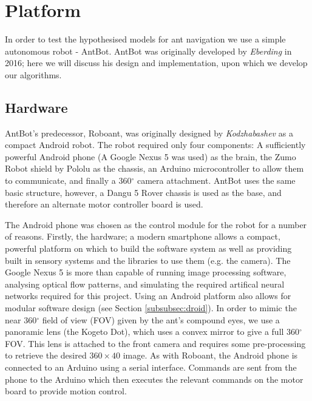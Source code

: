 \documentclass[a4paper,11pt,twoside,openright]{article}
\let\oldsection\section
\def\section{\cleardoublepage\oldsection}
\begin{document}
\section{ Platform } \label{sec:platform}
In order to test the hypothesised models for ant navigation we use a simple autonomous robot - AntBot.
AntBot was originally developed by \textit{Eberding} in 2016; here we will discuss his design and
implementation, upon which we develop our algorithms.

\subsection{ Hardware }
AntBot's predecessor, Roboant, was originally designed by \textit{Kodzhabashev} \cite{Kodzhabashev2014}
as a compact Android robot. The robot required only four components: A sufficiently powerful Android
phone (A Google Nexus 5 was used) as the brain, the Zumo Robot shield by Pololu as the chassis,
an Arduino microcontroller to allow them to communicate, and finally a 360$^{\circ}$ camera attachment.
AntBot uses the same basic structure, however, a Dangu 5 Rover chassis is used as the base, and
therefore an alternate motor controller board is used.
\newline

The Android phone was chosen as the control module for the robot for a number of reasons. Firstly,
the hardware; a modern smartphone allows a compact, powerful platform on which to build the
software system as well as providing built in sensory systems and the libraries to use them (e.g. the
camera). The Google Nexus 5 is more than capable of running image processing software, analysing
optical flow patterns, and simulating the required artifical neural networks required for this project.
Using an Android platform also allows for modular software design (see Section \ref{subsubsec:droid}).
In order to mimic the near 360$^{\circ}$ field of view (FOV) given by the ant's compound eyes, we use a
panoramic lens (the Kogeto Dot), which uses a convex mirror to give a full 360$^{\circ}$ FOV. This
lens is attached to the front camera and requires some pre-processing to retrieve the desired
$360\times40$ image. As with Roboant, the Android phone is connected to an Arduino using a serial
interface. Commands are sent from the phone to the Arduino which then executes the relevant commands
on the motor board to provide motion control.
\end{document}
